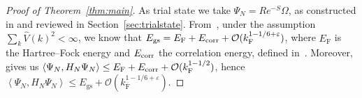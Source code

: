 \documentclass[12pt,a4paper]{article}
\numberwithin{equation}{section}
\newcommand{\cO}{\mathcal{O}}
\newcommand{\1}{\mathbb{I}}
\newcommand{\corr}{\textnormal{corr}}
\newcommand{\F}{\mathrm{F}}
\newcommand{\GS}{\mathrm{gs}}
\newcommand{\eva}[1]{\left\langle #1 \right\rangle}
\theoremstyle{plain}
\theoremstyle{definition}
\theoremstyle{remark}
\theoremstyle{plain}
\theoremstyle{definition}
\theoremstyle{remark}
\begin{document}
\begin{proof}[Proof of Theorem~\ref{thm:main}]
As trial state we take $ \Psi_N = R e^{-S} \Omega $, as constructed in \cite{CHN23} and reviewed in Section~\ref{sec:trialstate}. From~\cite[Corr.~1.3]{CHN24}, under the assumption $ \sum_k \hat{V}(k)^2 < \infty $, we know that $ E_{\GS} = E_{\F} + E_{\corr} + \cO(k_{\F}^{1 - 1/6 + \varepsilon}) $, where $ E_{\F} $ is the Hartree--Fock energy and $ E_{\corr}$ the correlation energy, defined in~\cite[(1.2) and (1.11)]{CHN24}. Moreover, \cite[Thm.~1.1]{CHN23} gives us $ \eva{\Psi_N, H_N \Psi_N} \le E_{\F} + E_{\corr} + \cO(k_{\F}^{1 - 1/2}) $, hence $ \eva{\Psi_N, H_N \Psi_N} \le E_{\GS} + \cO(k_{\F}^{1 - 1/6+ \varepsilon}) $.


\end{proof}
\end{document}
